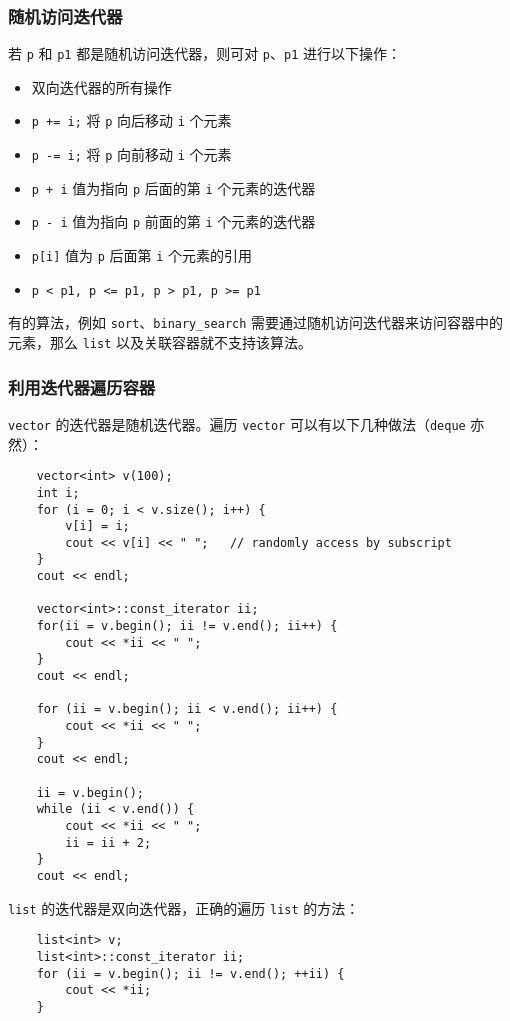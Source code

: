 \documentclass[UTF8]{ctexart}
\begin{document}
\subsubsection{随机访问迭代器}
若 \texttt{p} 和 \texttt{p1} 都是随机访问迭代器，则可对 \texttt{p}、\texttt{p1} 进行以下操作：
\begin{itemize}
    \item 双向迭代器的所有操作
    \item \texttt{p += i;} 将 \texttt{p} 向后移动 \texttt{i} 个元素
    \item \texttt{p -= i;} 将 \texttt{p} 向前移动 \texttt{i} 个元素
    \item \texttt{p + i} 值为指向 \texttt{p} 后面的第 \texttt{i} 个元素的迭代器
    \item \texttt{p - i} 值为指向 \texttt{p} 前面的第 \texttt{i} 个元素的迭代器
    \item \texttt{p[i]} 值为 \texttt{p} 后面第 \texttt{i} 个元素的引用
    \item \texttt{p < p1, p <= p1, p > p1, p >= p1}
\end{itemize}

有的算法，例如 \texttt{sort}、\texttt{binary\_search} 需要通过随机访问迭代器来访问容器中的元素，那么
\texttt{list} 以及关联容器就不支持该算法。

\subsubsection{利用迭代器遍历容器}
\texttt{vector} 的迭代器是随机迭代器。遍历 \texttt{vector} 可以有以下几种做法（\texttt{deque} 亦然）：
\begin{verbatim}
    vector<int> v(100);
    int i;
    for (i = 0; i < v.size(); i++) {
        v[i] = i;
        cout << v[i] << " ";   // randomly access by subscript
    }
    cout << endl;

    vector<int>::const_iterator ii;
    for(ii = v.begin(); ii != v.end(); ii++) {
        cout << *ii << " ";
    }
    cout << endl;

    for (ii = v.begin(); ii < v.end(); ii++) {
        cout << *ii << " ";
    }
    cout << endl;

    ii = v.begin();
    while (ii < v.end()) {
        cout << *ii << " ";
        ii = ii + 2;
    }
    cout << endl;
\end{verbatim}

\texttt{list} 的迭代器是双向迭代器，正确的遍历 \texttt{list} 的方法：
\begin{verbatim}
    list<int> v;
    list<int>::const_iterator ii;
    for (ii = v.begin(); ii != v.end(); ++ii) {
        cout << *ii;
    }
\end{verbatim}
\end{document}

